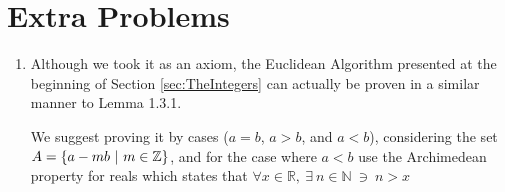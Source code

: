\section{Extra Problems}

\begin{enumerate}
    \item Although we took it as an axiom, the Euclidean Algorithm presented at the beginning of
    Section \ref{sec:TheIntegers} can actually be proven in a similar manner to Lemma 1.3.1.

    We suggest proving it by cases ($a=b$, $a>b$, and $a<b$), considering the set
    $A=\{a-mb \ | \ m \in {\mathbb{Z}}\}$, and for the case where $a<b$ use the Archimedean property for reals
    which states that $\forall x \in \mathbb{R}, \ \exists \ n \in \mathbb{N} \ \ni \ n>x$
\end{enumerate}
